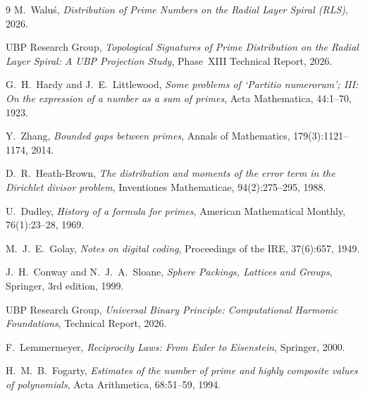 \documentclass[11pt,a4paper]{article}
\theoremstyle{definition}
\begin{document}
\begin{thebibliography}{9}
M.~Walu\'{s},
\emph{Distribution of Prime Numbers on the Radial Layer Spiral (RLS)},
2026.

UBP Research Group,
\emph{Topological Signatures of Prime Distribution on the Radial Layer Spiral:
A UBP Projection Study},
Phase~XIII Technical Report, 2026.

G.~H.~Hardy and J.~E.~Littlewood,
\emph{Some problems of `Partitio numerorum'; III: On the expression of a
number as a sum of primes},
Acta Mathematica, 44:1--70, 1923.

Y.~Zhang,
\emph{Bounded gaps between primes},
Annals of Mathematics, 179(3):1121--1174, 2014.

D.~R.~Heath-Brown,
\emph{The distribution and moments of the error term in the Dirichlet
divisor problem},
Inventiones Mathematicae, 94(2):275--295, 1988.

U.~Dudley,
\emph{History of a formula for primes},
American Mathematical Monthly, 76(1):23--28, 1969.

M.~J.~E.~Golay,
\emph{Notes on digital coding},
Proceedings of the IRE, 37(6):657, 1949.

J.~H.~Conway and N.~J.~A.~Sloane,
\emph{Sphere Packings, Lattices and Groups},
Springer, 3rd edition, 1999.

UBP Research Group,
\emph{Universal Binary Principle: Computational Harmonic Foundations},
Technical Report, 2026.

F.~Lemmermeyer,
\emph{Reciprocity Laws: From Euler to Eisenstein},
Springer, 2000.

H.~M.~B.~Fogarty,
\emph{Estimates of the number of prime and highly composite values of
polynomials},
Acta Arithmetica, 68:51--59, 1994.
\end{thebibliography}
\end{document}
